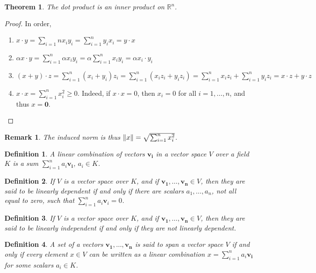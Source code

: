 \documentclass[12pt,oneside]{book}
\theoremstyle{mystyle}
\newtheorem{theorem}{Theorem}[section]
\newtheorem{definition}{Definition}[section]
\newtheorem{remark}{Remark}[section]
\begin{document}
\begin{theorem}
The dot product is an inner product on $\mathbb{R}^n$.
\end{theorem}
\begin{proof}
In order,
\begin{enumerate}
\item $x\cdot y = \sum_{i=1}{n} x_i y_i = \sum_{i=1}^{n} y_i x_i = y\cdot x$
\item $\alpha x\cdot y = \sum_{i=1}^{n} \alpha x_i y_i = \alpha \sum_{i=1}^{n} x_i y_i = \alpha x_i \cdot y_i$
\item $(x+y)\cdot z = \sum_{i=1}^{n} (x_i+y_i)z_i = \sum_{i=1}^{n} (x_iz_i +y_i z_i)=\sum_{i=1}^{n}x_i z_i+\sum_{i=1}^{n} y_i z_i = x\cdot z + y\cdot z$
\item $x\cdot x = \sum_{i=1}^{n} x_i^2 \geq 0$. Indeed, if $x\cdot x = 0$, then $x_i = 0$ for all $i=1,\hdots, n$, and thus $x=\mathbf{0}$.
\end{enumerate}
\end{proof}

\begin{remark}
The induced norm is thus $\norm{x} = \sqrt{\sum_{i=1}^{n} x_i^2}$.
\end{remark}

\begin{definition}
A linear combination of vectors $\mathbf{v_i}$ in a vector space $V$ over a field $K$ is a sum $\sum_{i=1}^{n} a_i \mathbf{v_i}$, $a_i \in K$.
\end{definition}

\begin{definition}
If $V$ is a vector space over $K$, and if $\mathbf{v_1},\hdots, \mathbf{v_n}\in V$, then they are said to be linearly dependent if and only if there are scalars $a_1,\hdots, a_n$, not all equal to zero, such that $\sum_{i=1}^{n} a_i \mathbf{v}_i = 0$.
\end{definition}

\begin{definition}
If $V$ is a vector space over $K$, and if $\mathbf{v_1},\hdots, \mathbf{v_n}\in V$, then they are said to be linearly independent if and only if they are not linearly dependent.
\end{definition}

\begin{definition}
A set of a vectors $\mathbf{v_1},\hdots, \mathbf{v_n}$ is said to span a vector space $V$ if and only if every element $x\in V$ can be written as a linear combination $x=\sum_{i=1}^{n} a_i \mathbf{v_i}$ for some scalars $a_i \in K$.
\end{definition}
\end{document}

